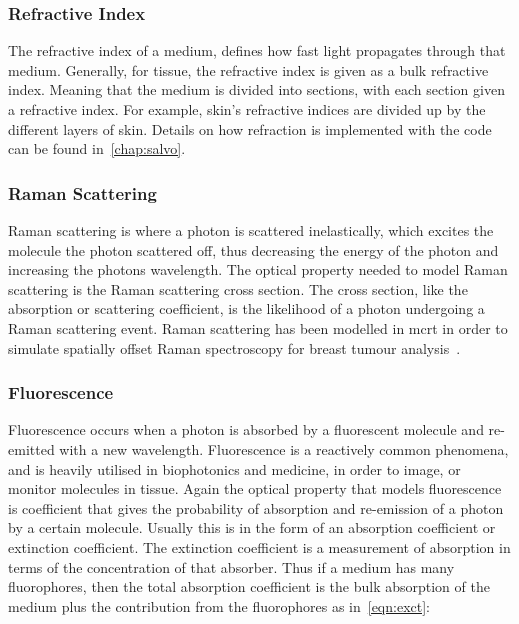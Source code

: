 \medskip

\subsubsection*{Refractive Index}
The refractive index of a medium, defines how fast light propagates through that medium. Generally, for tissue, the refractive index is given as a bulk refractive index. Meaning that the medium is divided into sections, with each section given a refractive index. For example, skin's refractive indices are divided up by the different layers of skin. Details on how refraction is implemented with the code can  be found in~\cref{chap:salvo}.

\medskip

\subsubsection*{Raman Scattering}
Raman scattering is where a photon is scattered inelastically, which excites the molecule the photon scattered off, thus decreasing the energy of the photon and increasing the photons wavelength. 
The optical property needed to model Raman scattering is the Raman scattering cross section. The cross section, like the absorption or scattering coefficient, is the likelihood of a photon undergoing a Raman scattering event. Raman scattering has been modelled in \gls*{mcrt} in order to simulate spatially offset Raman spectroscopy for breast tumour analysis~\cite{keller2010monte}.

\medskip

\subsubsection*{Fluorescence}



Fluorescence occurs when a photon is absorbed by a fluorescent molecule and re-emitted with a new wavelength. Fluorescence	is a reactively common phenomena, and is heavily utilised in biophotonics and medicine, in order to image, or monitor molecules in tissue. Again the optical property that models fluorescence is coefficient that gives the probability of absorption and re-emission of a photon by a certain molecule. Usually this is in the form of an absorption coefficient or extinction coefficient. The extinction coefficient is a measurement of absorption in terms of the concentration of that absorber. Thus if a medium has many fluorophores, then the total absorption coefficient is the bulk absorption of the medium plus the contribution from the fluorophores as in~\cref{eqn:exct}:

